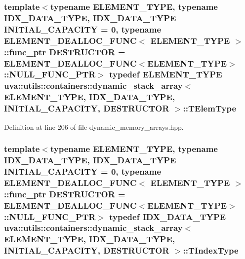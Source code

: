 \subsubsection[{T\+Elem\+Type}]{\setlength{\rightskip}{0pt plus 5cm}template$<$typename E\+L\+E\+M\+E\+N\+T\+\_\+\+T\+Y\+P\+E, typename I\+D\+X\+\_\+\+D\+A\+T\+A\+\_\+\+T\+Y\+P\+E, I\+D\+X\+\_\+\+D\+A\+T\+A\+\_\+\+T\+Y\+P\+E I\+N\+I\+T\+I\+A\+L\+\_\+\+C\+A\+P\+A\+C\+I\+T\+Y = 0, typename E\+L\+E\+M\+E\+N\+T\+\_\+\+D\+E\+A\+L\+L\+O\+C\+\_\+\+F\+U\+N\+C$<$ E\+L\+E\+M\+E\+N\+T\+\_\+\+T\+Y\+P\+E $>$\+::func\+\_\+ptr D\+E\+S\+T\+R\+U\+C\+T\+O\+R = E\+L\+E\+M\+E\+N\+T\+\_\+\+D\+E\+A\+L\+L\+O\+C\+\_\+\+F\+U\+N\+C$<$\+E\+L\+E\+M\+E\+N\+T\+\_\+\+T\+Y\+P\+E$>$\+::\+N\+U\+L\+L\+\_\+\+F\+U\+N\+C\+\_\+\+P\+T\+R$>$ typedef E\+L\+E\+M\+E\+N\+T\+\_\+\+T\+Y\+P\+E {\bf uva\+::utils\+::containers\+::dynamic\+\_\+stack\+\_\+array}$<$ E\+L\+E\+M\+E\+N\+T\+\_\+\+T\+Y\+P\+E, I\+D\+X\+\_\+\+D\+A\+T\+A\+\_\+\+T\+Y\+P\+E, I\+N\+I\+T\+I\+A\+L\+\_\+\+C\+A\+P\+A\+C\+I\+T\+Y, D\+E\+S\+T\+R\+U\+C\+T\+O\+R $>$\+::{\bf T\+Elem\+Type}}\label{classuva_1_1utils_1_1containers_1_1dynamic__stack__array_a28bc953e0b84129b26badd8de1c7708f}


Definition at line 206 of file dynamic\+\_\+memory\+\_\+arrays.\+hpp.

\hypertarget{classuva_1_1utils_1_1containers_1_1dynamic__stack__array_af11e2fba505f2b4c1ddf9babf9a1063c}{}
\subsubsection[{T\+Index\+Type}]{\setlength{\rightskip}{0pt plus 5cm}template$<$typename E\+L\+E\+M\+E\+N\+T\+\_\+\+T\+Y\+P\+E, typename I\+D\+X\+\_\+\+D\+A\+T\+A\+\_\+\+T\+Y\+P\+E, I\+D\+X\+\_\+\+D\+A\+T\+A\+\_\+\+T\+Y\+P\+E I\+N\+I\+T\+I\+A\+L\+\_\+\+C\+A\+P\+A\+C\+I\+T\+Y = 0, typename E\+L\+E\+M\+E\+N\+T\+\_\+\+D\+E\+A\+L\+L\+O\+C\+\_\+\+F\+U\+N\+C$<$ E\+L\+E\+M\+E\+N\+T\+\_\+\+T\+Y\+P\+E $>$\+::func\+\_\+ptr D\+E\+S\+T\+R\+U\+C\+T\+O\+R = E\+L\+E\+M\+E\+N\+T\+\_\+\+D\+E\+A\+L\+L\+O\+C\+\_\+\+F\+U\+N\+C$<$\+E\+L\+E\+M\+E\+N\+T\+\_\+\+T\+Y\+P\+E$>$\+::\+N\+U\+L\+L\+\_\+\+F\+U\+N\+C\+\_\+\+P\+T\+R$>$ typedef I\+D\+X\+\_\+\+D\+A\+T\+A\+\_\+\+T\+Y\+P\+E {\bf uva\+::utils\+::containers\+::dynamic\+\_\+stack\+\_\+array}$<$ E\+L\+E\+M\+E\+N\+T\+\_\+\+T\+Y\+P\+E, I\+D\+X\+\_\+\+D\+A\+T\+A\+\_\+\+T\+Y\+P\+E, I\+N\+I\+T\+I\+A\+L\+\_\+\+C\+A\+P\+A\+C\+I\+T\+Y, D\+E\+S\+T\+R\+U\+C\+T\+O\+R $>$\+::{\bf T\+Index\+Type}}\label{classuva_1_1utils_1_1containers_1_1dynamic__stack__array_af11e2fba505f2b4c1ddf9babf9a1063c}


